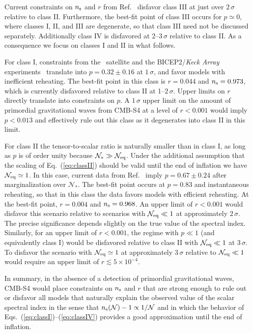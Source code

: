 Current constraints on $n_{\rm s}$ and $r$ from Ref.~\cite{Ade:2015tva} disfavor class III at just over $2\,\sigma$ relative to class II. Furthermore, the best-fit point of class III occurs for $p\simeq 0$, where classes I, II, and III are degenerate, so that class III need not be discussed separately. Additionally class IV is disfavored at 2--$3\,\sigma$ relative to class II. As a consequence we focus on classes I and II in what follows.

For class I, constraints from the \planck\ satellite and the { BICEP}2/{\em Keck Array} experiments~\cite{Ade:2015tva} translate into $p=0.32\pm0.16$ at $1\,\sigma$, and favor models with inefficient reheating. The best-fit point in this class is $r=0.044$ and $n_{\rm s}=0.973$, which is currently disfavored relative to class II at 1--$2\,\sigma$. Upper limits on $r$ directly translate into constraints on $p$. A $1\,\sigma$ upper limit on the amount of primordial gravitational waves from CMB-S4 at a level of $r<0.001$ would imply $p<0.013$ and effectively rule out this class as it degenerates into class II in this limit. 

For class II the tensor-to-scalar ratio is naturally smaller than in class I, as long as $p$ is of order unity because $\mathcal{N}_\ast\gg\mathcal{N}_{\rm eq}$. Under the additional assumption that the scaling of Eq.~(\ref{eq:classII}) should be valid until the end of inflation we have $\mathcal{N}_{\rm eq}\simeq 1$. In this case, current data from Ref.~\cite{Ade:2015tva} imply $p=0.67\pm0.24$ after marginalization over $\mathcal{N}_\ast$. The best-fit point occurs at $p=0.83$ and instantaneous reheating, so that in this class the data favors models with efficient reheating. At the best-fit point, $r=0.004$ and $n_{\rm s}=0.968$. An upper limit of $r<0.001$ would disfavor this scenario relative to scenarios with $\mathcal{N}_{\rm eq}\ll 1$ at approximately $2\,\sigma$. The precise significance depends slightly on the true value of the spectral index. Similarly, for an upper limit of $r<0.001$, the regime with $p\ll1$ (and equivalently class I) would be disfavored relative to class II with $\mathcal{N}_{\rm eq}\ll 1$ at $3\,\sigma$. To disfavor the scenario with $\mathcal{N}_{\rm eq}\simeq 1$ at approximately $3\,\sigma$ relative to $\mathcal{N}_{\rm eq}\ll 1$ would require an upper limit of $r\lesssim 5\times 10^{-4}$.  

In summary, in the absence of a detection of primordial gravitational waves, CMB-S4 would place constraints on $n_{\rm s}$ and $r$ that are strong enough to rule out or disfavor all models that naturally explain the observed value of the scalar spectral index in the sense that $n_{\rm s}(\mathcal{N})-1\propto 1/\mathcal{N}$ and in which the behavior of Eqs.~(\ref{eq:classI})--(\ref{eq:classIV}) provides a good approximation until the end of inflation. 

